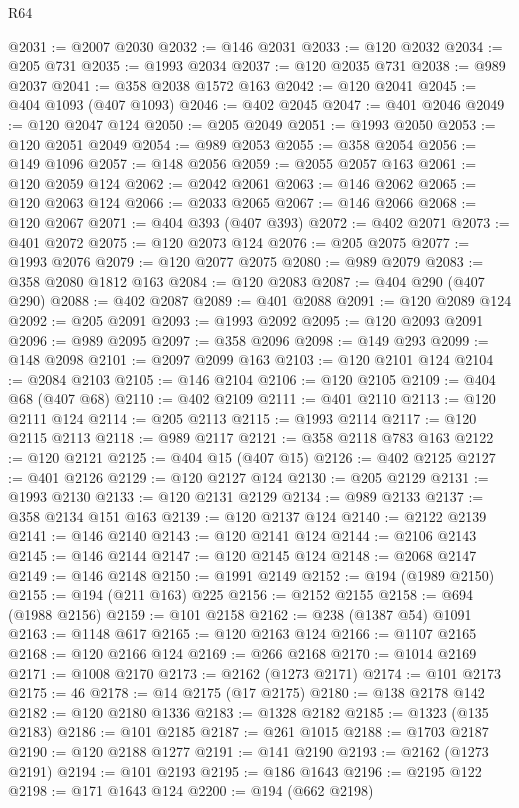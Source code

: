 \begin{lexlean}{R64}
\begin{coremodule}
@2031 := @2007 @2030
@2032 := @146 @2031
@2033 := @120 @2032
@2034 := @205 @731
@2035 := @1993 @2034
@2037 := @120 @2035 @731
@2038 := @989 @2037
@2041 := @358 @2038 @1572 @163
@2042 := @120 @2041
@2045 := @404 @1093 (@407 @1093)
@2046 := @402 @2045
@2047 := @401 @2046
@2049 := @120 @2047 @124
@2050 := @205 @2049
@2051 := @1993 @2050
@2053 := @120 @2051 @2049
@2054 := @989 @2053
@2055 := @358 @2054
@2056 := @149 @1096
@2057 := @148 @2056
@2059 := @2055 @2057 @163
@2061 := @120 @2059 @124
@2062 := @2042 @2061
@2063 := @146 @2062
@2065 := @120 @2063 @124
@2066 := @2033 @2065
@2067 := @146 @2066
@2068 := @120 @2067
@2071 := @404 @393 (@407 @393)
@2072 := @402 @2071
@2073 := @401 @2072
@2075 := @120 @2073 @124
@2076 := @205 @2075
@2077 := @1993 @2076
@2079 := @120 @2077 @2075
@2080 := @989 @2079
@2083 := @358 @2080 @1812 @163
@2084 := @120 @2083
@2087 := @404 @290 (@407 @290)
@2088 := @402 @2087
@2089 := @401 @2088
@2091 := @120 @2089 @124
@2092 := @205 @2091
@2093 := @1993 @2092
@2095 := @120 @2093 @2091
@2096 := @989 @2095
@2097 := @358 @2096
@2098 := @149 @293
@2099 := @148 @2098
@2101 := @2097 @2099 @163
@2103 := @120 @2101 @124
@2104 := @2084 @2103
@2105 := @146 @2104
@2106 := @120 @2105
@2109 := @404 @68 (@407 @68)
@2110 := @402 @2109
@2111 := @401 @2110
@2113 := @120 @2111 @124
@2114 := @205 @2113
@2115 := @1993 @2114
@2117 := @120 @2115 @2113
@2118 := @989 @2117
@2121 := @358 @2118 @783 @163
@2122 := @120 @2121
@2125 := @404 @15 (@407 @15)
@2126 := @402 @2125
@2127 := @401 @2126
@2129 := @120 @2127 @124
@2130 := @205 @2129
@2131 := @1993 @2130
@2133 := @120 @2131 @2129
@2134 := @989 @2133
@2137 := @358 @2134 @151 @163
@2139 := @120 @2137 @124
@2140 := @2122 @2139
@2141 := @146 @2140
@2143 := @120 @2141 @124
@2144 := @2106 @2143
@2145 := @146 @2144
@2147 := @120 @2145 @124
@2148 := @2068 @2147
@2149 := @146 @2148
@2150 := @1991 @2149
@2152 := @194 (@1989 @2150)
@2155 := @194 (@211 @163) @225
@2156 := @2152 @2155
@2158 := @694 (@1988 @2156)
@2159 := @101 @2158
@2162 := @238 (@1387 @54) @1091
@2163 := @1148 @617
@2165 := @120 @2163 @124
@2166 := @1107 @2165
@2168 := @120 @2166 @124
@2169 := @266 @2168
@2170 := @1014 @2169
@2171 := @1008 @2170
@2173 := @2162 (@1273 @2171)
@2174 := @101 @2173
@2175 := 46
@2178 := @14 @2175 (@17 @2175)
@2180 := @138 @2178 @142
@2182 := @120 @2180 @1336
@2183 := @1328 @2182
@2185 := @1323 (@135 @2183)
@2186 := @101 @2185
@2187 := @261 @1015
@2188 := @1703 @2187
@2190 := @120 @2188 @1277
@2191 := @141 @2190
@2193 := @2162 (@1273 @2191)
@2194 := @101 @2193
@2195 := @186 @1643
@2196 := @2195 @122
@2198 := @171 @1643 @124
@2200 := @194 (@662 @2198)

\end{coremodule}
\end{lexlean}
